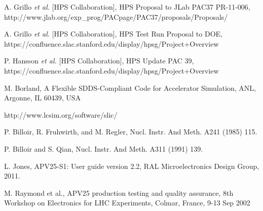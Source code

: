 \begin{thebibliography}{99}


 A. Grillo {\it et al.} [HPS Collaboration], HPS Proposal to JLab PAC37 PR-11-006,
 http://www.jlab.org/exp\_prog/PACpage/PAC37/proposals/Proposals/

 A. Grillo {\it et al.} [HPS Collaboration], HPS Test Run Proposal to DOE, 
https://confluence.slac.stanford.edu/display/hpsg/Project+Overview

 P. Hansson {\it et al.} [HPS Collaboration], HPS Update PAC 39, 
https://confluence.slac.stanford.edu/display/hpsg/Project+Overview



 
 M. Borland, A Flexible SDDS-Compliant Code for Accelerator Simulation, ANL, Argonne, IL 60439, USA
 
  http://www.lcsim.org/software/slic/
 
 P. Billoir, R. Fruhwirth, and M. Regler, Nucl. Instr. And Meth. A241 (1985) 115. 

 P. Billoir and S. Qian, Nucl. Instr. And Meth. A311 (1991) 139. 

 L. Jones, APV25-S1: User guide version 2.2, RAL Microelectronics Design Group, 2011.

 M. Raymond et al., APV25 production testing and quality assurance, 8th Workshop on Electronics for LHC
	              Experiments, Colmar, France, 9-13 Sep 2002
	               
\end{thebibliography} 